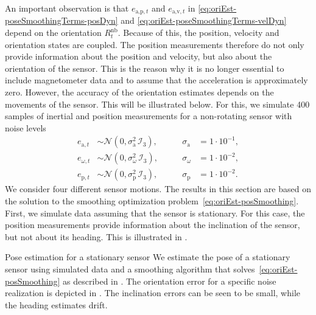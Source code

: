 An important observation is that $e_{\text{a,p},t}$ and $e_{\text{a,v},t}$ in \eqref{eq:oriEst-poseSmoothingTerms-posDyn} and \eqref{eq:oriEst-poseSmoothingTerms-velDyn} depend on the orientation $R_t^\text{nb}$. Because of this, the position, velocity and orientation states are coupled. The position measurements therefore do not only provide information about the position and velocity, but also about the orientation of the sensor. This is the reason why it is no longer essential to include magnetometer data and to assume that the acceleration is approximately zero. However, the accuracy of the orientation estimates depends on the movements of the sensor. This will be illustrated below. For this, we simulate 400 samples of inertial and position measurements for a non-rotating sensor with noise levels
\begin{align*}
e_{\text{a},t} &\sim \mathcal{N}(0, \sigma_\text{a}^2 \, \mathcal{I}_3), \qquad & \sigma_\text{a} &= 1 \cdot 10^{-1}, \\
e_{\omega,t} &\sim \mathcal{N}(0, \sigma_\omega^2 \, \mathcal{I}_3), \qquad & \sigma_\omega &= 1 \cdot 10^{-2}, \\
e_{\text{p},t} &\sim \mathcal{N}(0, \sigma_\text{p}^2 \, \mathcal{I}_3), \qquad & \sigma_\text{p} &= 1 \cdot 10^{-2}.
\end{align*}
We consider four different sensor motions. The results in this section are based on the solution to the smoothing optimization problem~\eqref{eq:oriEst-posSmoothing}. First, we simulate data assuming that the sensor is stationary. For this case, the position measurements provide information about the inclination of the sensor, but not about its heading. This is illustrated in .

\begin{myexample}{Pose estimation for a stationary sensor}%
\label{ex:oriEst-poseOriError-stat}%
We estimate the pose of a stationary sensor using simulated data and a smoothing algorithm that solves~\eqref{eq:oriEst-posSmoothing} as described in . The orientation error for a specific noise realization is depicted in . The inclination errors can be seen to be small, while the heading estimates drift. 
\end{myexample}

